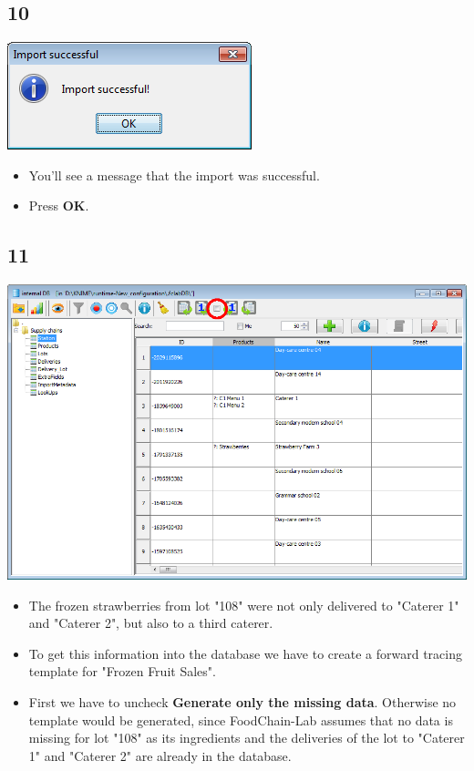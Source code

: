 \documentclass{beamer}
\begin{document}
\subsection{10}
\begin{frame}
	\begin{center}
  		\includegraphics[height=0.2\textheight]{10.png}
	\end{center}
	\begin{itemize}
		\item You'll see a message that the import was successful.
		\item Press \textbf{OK}.
	\end{itemize}
\end{frame}

\subsection{11}
\begin{frame}
	\begin{center}
  		\includegraphics[height=0.4\textheight]{11.png}
	\end{center}
	\begin{itemize}
		\item The frozen strawberries from lot "108" were not only delivered to "Caterer 1" and "Caterer 2", but also to a third caterer.
		\item To get this information into the database we have to create a forward tracing template for "Frozen Fruit Sales".
		\item First we have to uncheck \textbf{Generate only the missing data}. Otherwise no template would be generated, since FoodChain-Lab assumes that no data is missing for lot "108" as its ingredients and the deliveries of the lot to "Caterer 1" and "Caterer 2" are already in the database.
	\end{itemize}
\end{frame}
\end{document}
